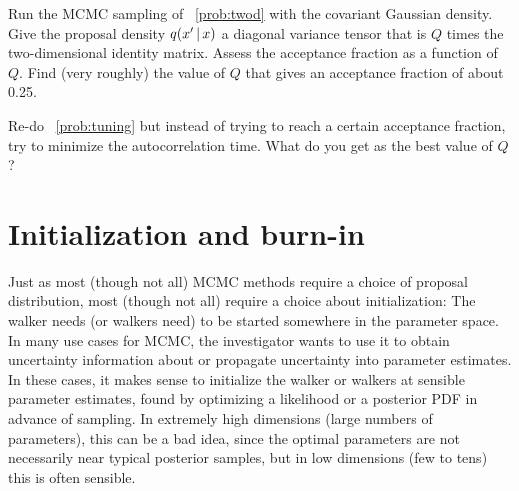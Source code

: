 \documentclass[12pt,twoside,pdftex]{article}
\begin{document}
\begin{problem}\label{prob:tuning}
Run the MCMC sampling of \problemname~\ref{prob:twod} with the
covariant Gaussian density.
Give the proposal density $q(x'\,|\, x)$ a diagonal variance
tensor that is $Q$ times the two-dimensional identity matrix.
Assess the acceptance fraction as a function of $Q$.
Find (very roughly) the value of $Q$ that gives an acceptance
fraction of about 0.25.
\end{problem}

\begin{problem}
Re-do \problemname~\ref{prob:tuning} but instead of trying to reach a
certain acceptance fraction, try to minimize the autocorrelation time.
What do you get as the best value of $Q$?
\end{problem}

\section{Initialization and burn-in}

Just as most (though not all) MCMC methods require a choice of
proposal distribution, most (though not all) require a choice about
initialization:
The walker needs (or walkers need) to be started somewhere in the
parameter space.
In many use cases for MCMC, the investigator wants to use it to obtain
uncertainty information about or propagate uncertainty into parameter
estimates.
In these cases, it makes sense to initialize the walker or walkers at
sensible parameter estimates, found by optimizing a likelihood or a
posterior PDF in advance of sampling.
In extremely high dimensions (large numbers of parameters), this can
be a bad idea, since the optimal parameters are not necessarily near
typical posterior samples, but
in low dimensions (few to tens) this is often sensible.
\end{document}
